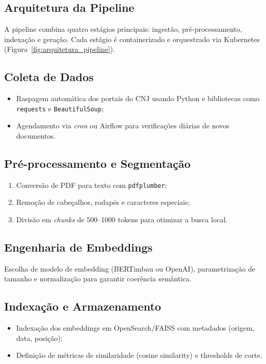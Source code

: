 \begin{description}
\section{Arquitetura da Pipeline}
A pipeline combina quatro estágios principais: ingestão, pré‐processamento, indexação e geração. Cada estágio é containerizado e orquestrado via Kubernetes (Figura~\ref{fig:arquitetura_pipeline}).

\subsection{Coleta de Dados}
\begin{itemize}[label=\textbullet]
  \item Raspagem automática dos portais do CNJ usando Python e bibliotecas como \texttt{requests} e \texttt{BeautifulSoup};
  \item Agendamento via \emph{cron} ou Airflow para verificações diárias de novos documentos.
\end{itemize}

\subsection{Pré-processamento e Segmentação}
\begin{enumerate}[label=\arabic*.]
  \item Conversão de PDF para texto com \texttt{pdfplumber};
  \item Remoção de cabeçalhos, rodapés e caracteres especiais;
  \item Divisão em \emph{chunks} de 500--1000 tokens para otimizar a busca local.
\end{enumerate}

\subsection{Engenharia de Embeddings}
Escolha de modelo de embedding (BERTimbau ou OpenAI), parametrização de tamanho e normalização para garantir coerência semântica.

\subsection{Indexação e Armazenamento}
\begin{itemize}[label=\textbullet]
  \item Indexação dos embeddings em OpenSearch/FAISS com metadados (origem, data, posição);
  \item Definição de métricas de similaridade (cosine similarity) e thresholds de corte.
\end{itemize}


\end{description}
